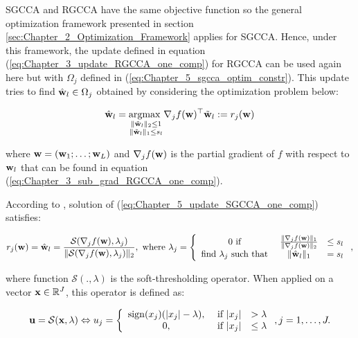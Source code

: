 \documentclass[
]{jss}
\begin{document}
SGCCA and RGCCA have the same objective function so the general
optimization framework presented in section
\ref{sec:Chapter_2_Optimization_Framework} applies for SGCCA. Hence,
under this framework, the update defined in equation
(\ref{eq:Chapter_3_update_RGCCA_one_comp}) for RGCCA can be used again
here but with \(\Omega_j\) defined in
(\ref{eq:Chapter_5_sgcca_optim_constr}). This update tries to find
\(\hat{\mathbf{w}}_l\in \Omega_j\) obtained by considering the optimization
problem below:

\begin{equation}
    \hat{\mathbf{w}}_l = \underset{\substack{\Vert \tilde{\mathbf{w}}_l \Vert_2 \leq 1\\ \Vert \tilde{\mathbf{w}}_l \Vert_1 \leq s_l}}{\mathrm{argmax~}} \nabla_j f(\mathbf{w})^\top \tilde{\mathbf{w}}_l := r_j(\mathbf{w}) 
\label{eq:Chapter_5_update_SGCCA_one_comp}
\end{equation}

where \(\mathbf{w} = \left(\mathbf{w}_1; \ldots ; \mathbf{w}_L\right)\) and
\(\nabla_j f(\mathbf{w})\) is the partial gradient of \(f\) with respect to
\(\mathbf{w}_l\) that can be found in equation
(\ref{eq:Chapter_3_sub_grad_RGCCA_one_comp}).

According to \citep{Witten2009}, solution of
(\ref{eq:Chapter_5_update_SGCCA_one_comp}) satisfies:

\begin{equation}
    r_j(\mathbf{w}) = \hat{\mathbf{w}}_l = \frac{\mathcal{S}(\nabla_j f(\mathbf{w}), \lambda_j)}{\Vert \mathcal{S}(\nabla_j f(\mathbf{w}), \lambda_j)\Vert_2}, ~\text{where}~ \lambda_j = \left\lbrace\begin{array}{ccc}
    0 ~ \text{if}~ & \frac{\Vert \nabla_j f(\mathbf{w}) \Vert_1}{\Vert \nabla_j f(\mathbf{w}) \Vert_2} & \leq s_l\\
    \text{find}~ \lambda_j ~\text{such that}~ & \Vert \hat{\mathbf{w}}_l \Vert_1 & = s_l    \end{array}\right.,
    \label{eq:Chapter_5_Witten_solution}
\end{equation}

where function \(\mathcal{S}(., \lambda)\) is the soft-thresholding
operator. When applied on a vector \(\mathbf{x}\in\mathbb{R}^J\), this operator
is defined as:

\begin{equation}
    \mathbf{u} = \mathcal{S}(\mathbf{x}, \lambda) \Leftrightarrow u_j = \left\lbrace
    \begin{array}{ccc}
        \mathrm{sign}(x_j)(|x_j| -  \lambda), &~ \text{if}~ |x_j| &> \lambda\\
        0, &~ \text{if}~ |x_j| &\leq \lambda\\ 
    \end{array}\right., j = 1, \ldots, J.
\end{equation}
\end{document}
